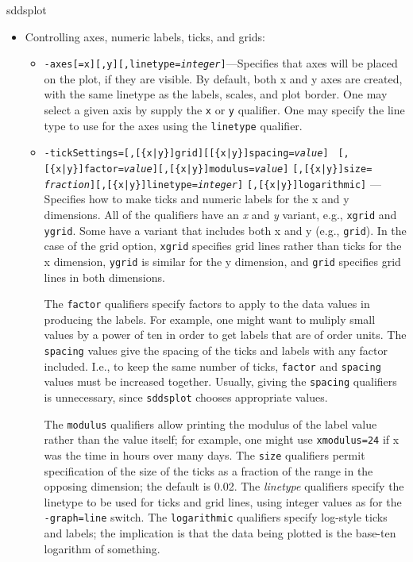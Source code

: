 \begin{sddsprog}{sddsplot}
\begin{itemize}
\begin{itemize}
  \item {\tt -pSpace={\em hMin}{,\em hMax}{,\em vMin}{,\em vMax}}---This option is seldom used, but allows
control of the region of the panel that is mapped to data coordinates, said region being the ``plot space''
or ``pspace''.  The first two coordinates give the horizontal extent, while the second two give the 
vertical extent.  The coordinate values are between 0 and 1.  The defaults are [0.15, 0.9]x[0.15, 0.9].
  \end{itemize}
\item Controlling axes, numeric labels, ticks, and grids:
  \begin{itemize}
  \item {\tt -axes[=x][,y][,linetype={\em integer}]}---Specifies that axes will be placed on the plot,
if they are visible.  By default, both x and y axes are created, with the same linetype as the labels,
scales, and plot border.  One may select a given axis by supply the {\tt x} or {\tt y} qualifier.
One may specify the line type to use for the axes using the {\tt linetype} qualifier.

  \item {\tt -tickSettings=[,[\{x|y\}]grid][[\{x|y\}]spacing={\em value}]} {\tt
[,[\{x|y\}]factor={\em value}][,[\{x|y\}]modulus={\em value}]} {\tt [,[\{x|y\}]size={\em
fraction}][,[\{x|y\}]linetype={\em integer}]} {\tt [,[\{x|y\}]logarithmic]} --- Specifies how to make
ticks and numeric labels for the x and y dimensions. All of the qualifiers have an {\em x} and {\em
y} variant, e.g., {\tt xgrid} and {\tt ygrid}.  Some have a variant that includes both x and y (e.g.,
{\tt grid}).  In the case of the grid option, {\tt xgrid} specifies grid lines rather than ticks for
the x dimension, {\tt ygrid} is similar for the y dimension, and {\tt grid} specifies grid lines in
both dimensions.

The {\tt factor} qualifiers specify factors to apply to the data values in producing the labels.  For example, one
might want to muliply small values by a power of ten in order to get labels that are of order units.  The {\tt
spacing} values give the spacing of the ticks and labels with any factor included.  I.e., to keep the same number
of ticks, {\tt factor} and {\tt spacing} values must be increased together.  Usually, giving the {\tt spacing}
qualifiers is unnecessary, since \verb|sddsplot| chooses appropriate values.

The {\tt modulus} qualifiers allow printing the modulus of the label value rather than the value itself; for
example, one might use {\tt xmodulus=24} if x was the time in hours over many days.  The {\tt size} qualifiers
permit specification of the size of the ticks as a fraction of the range in the opposing dimension; the default is
0.02.  The {\em linetype} qualifiers specify the linetype to be used for ticks and grid lines, using integer values
as for the {\tt -graph=line} switch.  The {\tt logarithmic} qualifiers specify log-style ticks and labels; the
implication is that the data being plotted is the base-ten logarithm of something.


\end{itemize}
\end{itemize}
\end{sddsprog}
